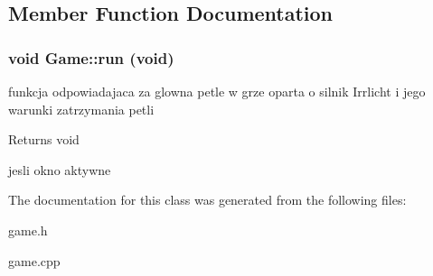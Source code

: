 \subsection{Member Function Documentation}
\hypertarget{class_game_a46165f87463fa8114fa44596ced90dbd}{
\subsubsection[{run}]{\setlength{\rightskip}{0pt plus 5cm}void Game::run (void)}}
\label{class_game_a46165f87463fa8114fa44596ced90dbd}
funkcja odpowiadajaca za glowna petle w grze oparta o silnik Irrlicht i jego warunki zatrzymania petli \begin{DoxyReturn}{Returns}
void 
\end{DoxyReturn}


jesli okno aktywne 

The documentation for this class was generated from the following files:\begin{DoxyCompactItemize}
\item 
game.h\item 
game.cpp\end{DoxyCompactItemize}
